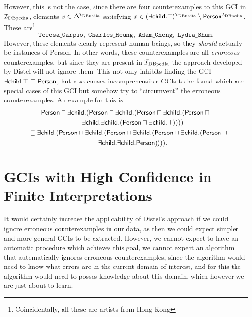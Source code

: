 However, this is not the case, since there are four counterexamples to this GCI in
${\mathcal{I}_{\text{DBpedia}}}$, \ie elements $x \in \Delta^{{\mathcal{I}_{\text{DBpedia}}}}$ satisfying $x \in (\sf \exists
child. \top)^{{\mathcal{I}_{\text{DBpedia}}}} \setminus Person^{{\mathcal{I}_{\text{DBpedia}}}}$.  These
are\footnote{Coincidentally, all these are artists from Hong Kong}
\begin{equation*}
  \mathtt{Teresa\_Carpio},\; \mathtt{Charles\_Heung},\;
  \mathtt{Adam\_Cheng}, \; \mathtt{Lydia\_Shum}.
\end{equation*}
However, these elements clearly represent human beings, so they \emph{should} actually be
instances of \textsf{Person}.  In other words, these counterexamples are all
\emph{erroneous} counterexamples, but since they are present in ${\mathcal{I}_{\text{DBpedia}}}$ the approach
developed by Distel will not ignore them.  This not only inhibits finding the GCI $\sf
\exists child. \top \sqsubseteq Person$, but also causes incomprehensible GCIs to be
found which are special cases of this GCI but somehow try to ``circumvent'' the erroneous
counterexamples. An example for this is
\begin{gather*}
  \sf Person \sqcap \exists child. (Person \sqcap \exists child. (Person \sqcap \exists child.
  (Person \sqcap {}\\
  \quad \quad \sf \exists child. \exists child. (Person \sqcap \exists child. \top))))
  \\
  \sf \quad \sqsubseteq
  \exists child. (Person \sqcap \exists child. (Person \sqcap \exists child. (Person \sqcap
  \exists child. (Person \sqcap {}\\
  \sf \quad \quad \exists child. \exists child. Person)))).
\end{gather*}

\section{GCIs with High Confidence in Finite Interpretations}
\label{sec:confident-gcis}

It would certainly increase the applicability of Distel's approach if we could ignore
erroneous counterexamples in our data, as then we could expect simpler and more general
GCIs to be extracted.  However, we cannot expect to have an automatic procedure which
achieves this goal, \ie we cannot expect an algorithm that automatically ignores erroneous
counterexamples, since the algorithm would need to know what errors are in the current
domain of interest, and for this the algorithm would need to posses knowledge about this
domain, which however we are just about to learn.

